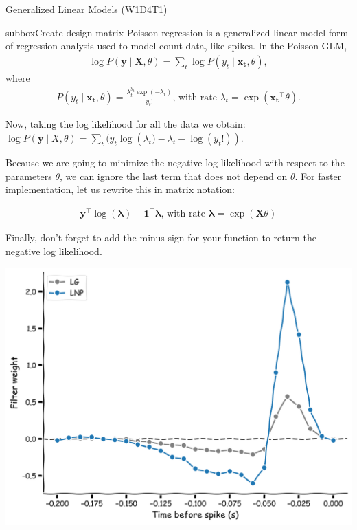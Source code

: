 \begin{textbox}{\href{https://compneuro.neuromatch.io/tutorials/W1D4_GeneralizedLinearModels/student/W1D4_Tutorial1.html}{Generalized Linear Models (W1D4T1)} }
\begin{subbox}{subbox}{Create design matrix}
\scriptsize
Poisson regression is a generalized linear model form of regression analysis used to model count data, like spikes.
In the Poisson GLM,
\begin{align}
\log P(\mathbf{y} \mid \mathbf{X}, \theta) = \sum_t \log P(y_t \mid \mathbf{x_t},\theta),
\end{align}
where
\begin{align}
P(y_t \mid \mathbf{x_t}, \theta) = \frac{\lambda_t^{y_t}\exp(-\lambda_t)}{y_t!} \text{, with rate } \lambda_t = \exp(\mathbf{x_t}^{\top} \theta).
\end{align}

Now, taking the log likelihood for all the data we obtain:
$\log P(\mathbf{y} \mid X, \theta) = \sum_t( y_t \log\left(\lambda_t) - \lambda_t - \log(y_t !)\right).$

Because we are going to minimize the negative log likelihood with respect to the parameters $\theta$, we can ignore the last term that does not depend on $\theta$. For faster implementation, let us rewrite this in matrix notation:

\begin{align}
\mathbf{y}^{\top} \log(\mathbf{\lambda}) - \mathbf{1}^{\top} \mathbf{\lambda} \text{, with  rate } \mathbf{\lambda} = \exp(\mathbf{X} \theta)
\end{align}

Finally, don't forget to add the minus sign for your function to return the negative log likelihood.

\centering
\includegraphics[scale=0.1]{Figures/GLM/GLMFigure3.png}
\end{subbox}


\end{textbox}
